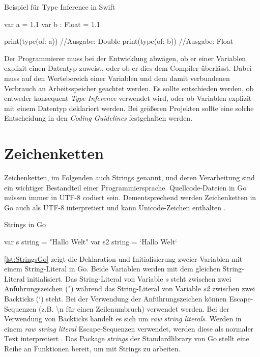 \begin{listing}
\caption{Beispiel für Type Inference in Swift}
\label{lst:TypeInferenceSwift2}
\begin{SwiftCode}
var a = 1.1
var b : Float = 1.1

print(type(of: a)) //Ausgabe: Double
print(type(of: b)) //Ausgabe: Float
\end{SwiftCode}
\end{listing}

Der Programmierer muss bei der Entwicklung abwägen, ob er einer Variablen explizit einen Datentyp zuweist, oder ob er dies dem Compiler überlässt. 
Dabei muss auf den Wertebereich einer Variablen und dem damit verbundenen Verbrauch an Arbeitsspeicher geachtet werden. 
Es sollte entschieden werden, ob entweder konsequent \emph{Type Inference} verwendet wird, oder ob Variablen explizit mit einem Datentyp deklariert werden. 
Bei größeren Projekten sollte eine solche Entscheidung in den \emph{Coding Guidelines} festgehalten werden.

\section{Zeichenketten}
Zeichenketten, im Folgenden auch Strings genannt, und deren Verarbeitung sind ein wichtiger Bestandteil einer Programmiersprache. 
Quellcode-Dateien in Go müssen immer in UTF-8 codiert sein. 
Dementsprechend werden Zeichenketten in Go auch als UTF-8 interpretiert und kann Unicode-Zeichen enthalten \cite[S.117]{Donovan.2016}.

\begin{listing}
\caption{Strings in Go}
\label{lst:StringsGo}
\begin{GoCode}
var s string = "Hallo Welt"
var s2 string = `Hallo Welt`
\end{GoCode}
\end{listing}

\autoref{lst:StringsGo} zeigt die Deklaration und Initialisierung zweier Variablen mit einem String-Literal in Go.
Beide Variablen werden mit dem gleichen String-Literal initialisiert. 
Das String-Literal von Variable \emph{s} steht zwischen zwei Anführungszeichen (") während das String-Literal von Variable \emph{s2} zwischen zwei Backticks (`) steht.
Bei der Verwendung der Anführungszeichen können Escape-Sequenzen (z.B. {\textbackslash}n für einen Zeilenumbruch) verwendet werden.
Bei der Verwendung von Backticks handelt es sich um \emph{raw string literals}. 
Werden in einem \emph{raw string literal} Escape-Sequenzen verwendet, werden diese als normaler Text interpretiert \cite[S.118]{Donovan.2016}.
Das Package \emph{strings} der Standardlibrary von Go stellt eine Reihe an Funktionen bereit, um mit Strings zu arbeiten.


